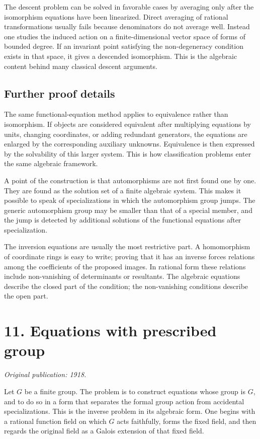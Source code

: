 \documentclass[12pt]{article}
\begin{document}
The descent problem can be solved in favorable cases by averaging only after the isomorphism
equations have been linearized. Direct averaging of rational transformations usually fails because
denominators do not average well. Instead one studies the induced action on a finite-dimensional
vector space of forms of bounded degree. If an invariant point satisfying the non-degeneracy
condition exists in that space, it gives a descended isomorphism. This is the algebraic content
behind many classical descent arguments.


\subsection{Further proof details}

The same functional-equation method applies to equivalence rather than isomorphism. If objects are
considered equivalent after multiplying equations by units, changing coordinates, or adding
redundant generators, the equations are enlarged by the corresponding auxiliary unknowns.
Equivalence is then expressed by the solvability of this larger system. This is how classification
problems enter the same algebraic framework.

A point of the construction is that automorphisms are not first found one by one. They are found as
the solution set of a finite algebraic system. This makes it possible to speak of specializations in
which the automorphism group jumps. The generic automorphism group may be smaller than that of a
special member, and the jump is detected by additional solutions of the functional equations after
specialization.

The inversion equations are usually the most restrictive part. A homomorphism of coordinate rings is
easy to write; proving that it has an inverse forces relations among the coefficients of the
proposed images. In rational form these relations include non-vanishing of determinants or
resultants. The algebraic equations describe the closed part of the condition; the non-vanishing
conditions describe the open part.


\section{11. Equations with prescribed group}

\textit{Original publication: 1918.}

Let \(G\) be a finite group. The problem is to construct equations whose group is \(G\), and to do
so in a form that separates the formal group action from accidental specializations. This is the
inverse problem in its algebraic form. One begins with a rational function field on which \(G\) acts
faithfully, forms the fixed field, and then regards the original field as a Galois extension of that
fixed field.
\end{document}
